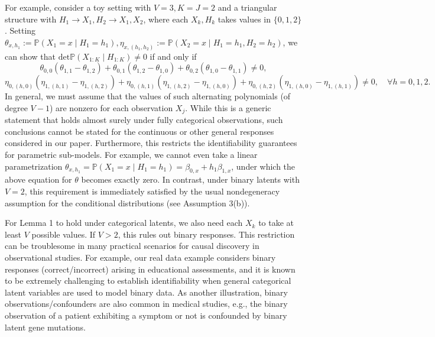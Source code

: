 \documentclass[10pt]{article} %
\newcommand{\PP}{\mathbb P}
\begin{document}
For example, consider a toy setting with $V=3,K=J=2$ and a triangular structure with $H_1 \to X_1, H_2 \to X_1, X_2$, where each $X_k,H_k$ takes values in $\{0,1,2\}$. Setting $\theta_{x,h_1}:=\PP(X_1=x \mid H_1 = h_1), \eta_{x,(h_1,h_2)} := \PP(X_2=x \mid H_1=h_1, H_2=h_2)$, we can show that $\text{det} \PP(X_{1:K} \mid H_{1:K}) \neq 0$ if and only if $$\theta_{0,0}(\theta_{1,1} - \theta_{1,2})+\theta_{0,1}(\theta_{1,2}-\theta_{1,0})+\theta_{0,2}(\theta_{1,0}-\theta_{1,1}) \neq 0,$$ $$\eta_{0,(h,0)}(\eta_{1,(h,1)}-\eta_{1,(h,2)})+\eta_{0,(h,1)}(\eta_{1,(h,2)}-\eta_{1,(h,0)})+\eta_{0,(h,2)}(\eta_{1,(h,0)}-\eta_{1,(h,1)}) \neq 0, \quad \forall h = 0,1,2.$$ In general, we must assume that the values of such alternating polynomials (of degree $V-1$) are nonzero for each observation $X_j$. While this is a generic statement that holds almost surely under fully categorical observations, such conclusions cannot be stated for the continuous or other general responses considered in our paper. Furthermore, this restricts the identifiability guarantees for parametric sub-models. For example, we cannot even take a linear parametrization $\theta_{x, h_1} = \PP(X_1 = x \mid H_1 = h_1) = \beta_{0,x} + h_1 \beta_{1,x}$, under which the above equation for $\theta$ becomes exactly zero. In contrast, under binary latents with $V=2$, this requirement is immediately satisfied by the usual nondegeneracy assumption for the conditional distributions (see Assumption 3(b)).

For Lemma 1 to hold under categorical latents, we also need each $X_k$ to take at least $V$ possible values. If $V>2$, this rules out binary responses. This restriction can be troublesome in many practical scenarios for causal discovery in observational studies. For example, our real data example considers binary responses (correct/incorrect) arising in educational assessments, and it is known to be extremely challenging to establish identifiability when general categorical latent variables are used to model binary data. As another illustration, binary observations/confounders are also common in medical studies, e.g., the binary observation of a patient exhibiting a symptom or not is confounded by binary latent gene mutations.
\end{document}
